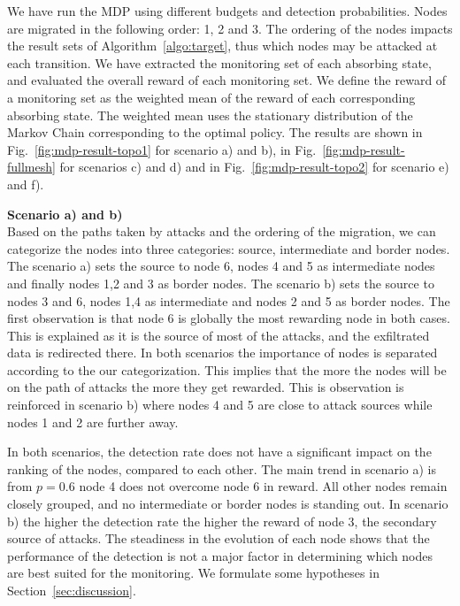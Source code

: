 

We have run the MDP using different budgets and detection probabilities.
Nodes are migrated in the following order: 1, 2 and 3.
The ordering of the nodes impacts the result sets of Algorithm~\ref{algo:target}, thus which nodes may be attacked at each transition.
We have extracted the monitoring set of each absorbing state, and evaluated the overall reward of each monitoring set.
We define the reward of a monitoring set as the weighted mean of the reward of each corresponding absorbing state.
The weighted mean uses the stationary distribution of the Markov Chain corresponding to the optimal policy.
The results are shown in Fig.~\ref{fig:mdp-result-topo1} for scenario a) and b), in Fig.~\ref{fig:mdp-result-fullmesh} for scenarios c) and d) and in Fig.~\ref{fig:mdp-result-topo2} for scenario e) and f).

\textbf{Scenario a) and b)\\}
Based on the paths taken by attacks and the ordering of the migration, we can categorize the nodes into three categories: source, intermediate and border nodes.
The scenario a) sets the source to node 6, nodes 4 and 5 as intermediate nodes and finally nodes 1,2 and 3 as border nodes.
The scenario b) sets the source to nodes 3 and 6, nodes 1,4 as intermediate and nodes 2 and 5 as border nodes.
The first observation is that node 6 is globally the most rewarding node in both cases.
This is explained as it is the source of most of the attacks, and the exfiltrated data is redirected there.
In both scenarios the importance of nodes is separated according to the our categorization. 
This implies that the more the nodes will be on the path of attacks the more they get rewarded.
This is observation is reinforced in scenario b) where nodes 4 and 5 are close to attack sources while nodes 1 and 2 are further away.

In both scenarios, the detection rate does not have a significant impact on the ranking of the nodes, compared to each other.
The main trend in scenario a) is from $p=0.6$  node 4 does not overcome node 6 in reward. All other nodes remain closely grouped, and no intermediate or border nodes is standing out.
In scenario b) the higher the detection rate the higher the reward of node 3, the secondary source of attacks.
The steadiness in the evolution of each node shows that the performance of the detection is not a major factor in determining which nodes are best suited for the monitoring. We formulate some hypotheses in Section~\ref{sec:discussion}.

